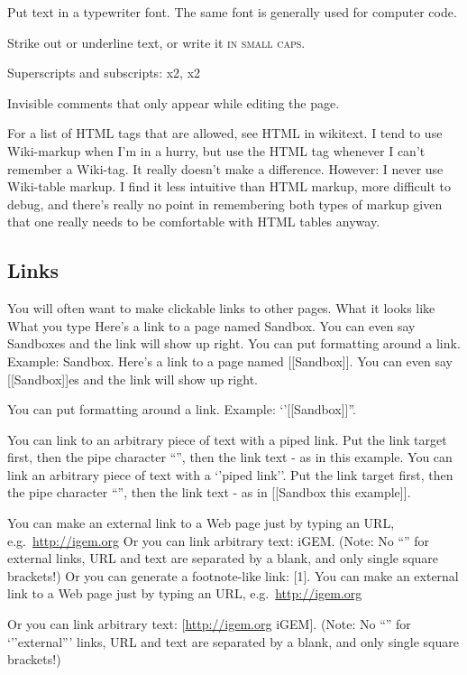 \documentclass[]{book}
\begin{document}
Put text in a typewriter font. The same font is generally used for
computer code.

Strike out or underline text, or write it \textsc{ in small caps}.

Superscripts and subscripts: x2, x2

Invisible comments that only appear while editing the page.

For a list of HTML tags that are allowed, see HTML in wikitext. I tend
to use Wiki-markup when I'm in a hurry, but use the HTML tag whenever I
can't remember a Wiki-tag. It really doesn't make a difference. However:
I never use Wiki-table markup. I find it less intuitive than HTML
markup, more difficult to debug, and there's really no point in
remembering both types of markup given that one really needs to be
comfortable with HTML tables anyway.

\subsection{Links}\label{links}

You will often want to make clickable links to other pages. What it
looks like What you type Here's a link to a page named Sandbox. You can
even say Sandboxes and the link will show up right. You can put
formatting around a link. Example: Sandbox. Here's a link to a page
named {[}{[}Sandbox{]}{]}. You can even say {[}{[}Sandbox{]}{]}es and
the link will show up right.

You can put formatting around a link. Example: `'{[}{[}Sandbox{]}{]}''.

You can link to an arbitrary piece of text with a piped link. Put the
link target first, then the pipe character ``\textbar{}'', then the link
text - as in this example. You can link an arbitrary piece of text with
a `'piped link''. Put the link target first, then the pipe character
``\textbar{}'', then the link text - as in {[}{[}Sandbox\textbar{} this
example{]}{]}.

You can make an external link to a Web page just by typing an URL,
e.g.~\url{http://igem.org} Or you can link arbitrary text: iGEM. (Note:
No ``\textbar{}'' for external links, URL and text are separated by a
blank, and only single square brackets!) Or you can generate a
footnote-like link: {[}1{]}. You can make an external link to a Web page
just by typing an URL, e.g.~\url{http://igem.org}

Or you can link arbitrary text: {[}\url{http://igem.org} iGEM{]}. (Note:
No ``\textbar{}'' for `''external''' links, URL and text are separated
by a blank, and only single square brackets!)
\end{document}
